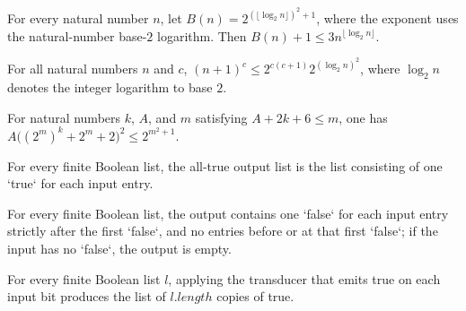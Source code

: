 \begin{theorem}
\label{Randomized.quasiPolyBudget_add_one_le}
\leanok
{}
For every natural number $n$, let $B(n)=2^{(\lfloor\log_2 n\rfloor)^2+1}$, where the
exponent uses the natural-number base-$2$ logarithm. Then $B(n)+1\le 3n^{\lfloor\log_2
n\rfloor}$.
\end{theorem}

\begin{theorem}
\label{Randomized.succ_pow_le_quasiPoly}
\leanok
{}
For all natural numbers $n$ and $c$, $(n+1)^c\le 2^{c(c+1)}2^{(\log_2 n)^2}$, where
$\log_2 n$ denotes the integer logarithm to base $2$.
\end{theorem}

\begin{theorem}
\label{Randomized.poly_sq_le_quasiPolyBudget}
\leanok
{}
For natural numbers $k$, $A$, and $m$ satisfying $A+2k+6\le m$, one has
$A\bigl((2^m)^k+2^m+2\bigr)^2\le 2^{m^2+1}$.
\end{theorem}

\begin{definition}
\label{Randomized.allTrue}
\leanok
{}
For every finite Boolean list, the all-true output list is the list consisting of one
`true` for each input entry.
\end{definition}

\begin{definition}
\label{Randomized.zerosAfterZero}
\leanok
{}
For every finite Boolean list, the output contains one `false` for each input entry
strictly after the first `false`, and no entries before or at that first `false`; if the
input has no `false`, the output is empty.
\end{definition}

\begin{theorem}
\label{Randomized.allTrue_eq}
\leanok
{}
For every finite Boolean list $l$, applying the transducer that emits true on each input
bit produces the list of $l.length$ copies of true.
\end{theorem}

